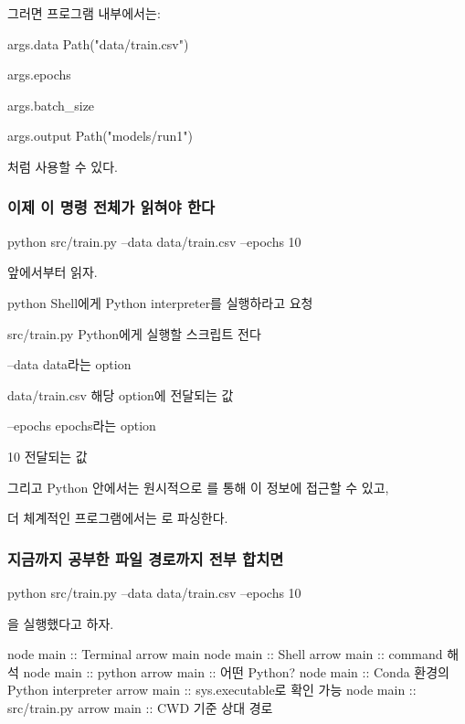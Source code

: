 그러면 프로그램 내부에서는:

\begin{dhksmry}[centered]
args.data
\ra Path("data/train.csv")

args.epochs

args.batch_size

args.output
\ra Path("models/run1")
\end{dhksmry}

처럼 사용할 수 있다.

\subsubsection{이제 이 명령 전체가 읽혀야 한다}

\begin{dhkzsh}
python src/train.py --data data/train.csv --epochs 10
\end{dhkzsh}

앞에서부터 읽자.

\begin{dhksmry}
    python \ra Shell에게 Python interpreter를 실행하라고 요청

    src/train.py \ra Python에게 실행할 스크립트 전다

    --data \ra data라는 option

    data/train.csv \ra 해당 option에 전달되는 값

    --epochs \ra epochs라는 option

    10 \ra 전달되는 값
\end{dhksmry}

그리고 Python 안에서는 원시적으로 를 통해 이 정보에 접근할 수 있고,

더 체계적인 프로그램에서는 로 파싱한다.

\subsubsection{지금까지 공부한 파일 경로까지 전부 합치면}

\begin{dhkzsh}
python src/train.py --data data/train.csv --epochs 10
\end{dhkzsh}

을 실행했다고 하자.

\begin{dhkbranch}[in=8]
node main :: Terminal
arrow main
node main :: Shell
arrow main :: command 해석
node main :: python
arrow main :: 어떤 Python?
node main :: Conda 환경의 Python interpreter
arrow main :: sys.executable로 확인 가능
node main :: src/train.py
arrow main :: CWD 기준 상대 경로
\end{dhkbranch}

